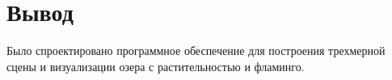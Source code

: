 

\section*{Вывод}

Было спроектировано программное обеспечение для построения трехмерной сцены и визуализации озера с растительностью и фламинго.